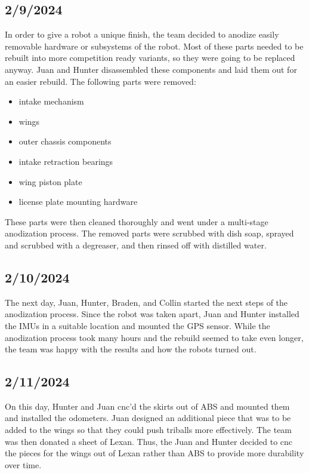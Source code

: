 \subsection{2/9/2024}
In order to give a robot a unique finish, the team decided to anodize easily removable hardware or subsystems of the robot.
Most of these parts needed to be rebuilt into more competition ready variants, so they were going to be replaced anyway. 
Juan and Hunter disassembled these components and laid them out for an easier rebuild. The following parts were removed:

\begin{itemize}
    \item intake mechanism
    \item wings
    \item outer chassis components
    \item intake retraction bearings
    \item wing piston plate
    \item license plate mounting hardware
\end{itemize}

These parts were then cleaned thoroughly and went under a multi-stage anodization process. The removed parts
were scrubbed with dish soap, sprayed and scrubbed with a degreaser, and then rinsed off with distilled water.


\subsection{2/10/2024}
The next day, Juan, Hunter, Braden, and Collin started the next steps of the anodization process. 
Since the robot was taken apart, Juan and Hunter installed the IMUs in a suitable location
and mounted the GPS sensor. While the anodization process took many hours and the rebuild seemed to take even longer,
the team was happy with the results and how the robots turned out. 


\subsection{2/11/2024}
On this day, Hunter and Juan cnc'd the skirts out of ABS and mounted them and installed the odometers. Juan designed
an additional piece that was to be added to the wings so that they could push triballs more effectively. The team
was then donated a sheet of Lexan. Thus, the Juan and Hunter decided to cnc the pieces for the wings out of Lexan 
rather than ABS to provide more durability over time.

